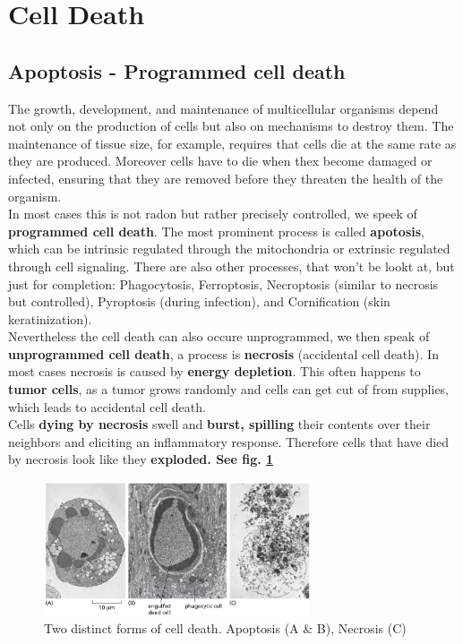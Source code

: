 \documentclass[../main.tex]{subfiles}
\begin{document}
	
\section{Cell Death}



\subsection{Apoptosis - Programmed cell death}
The growth, development, and maintenance of multicellular organisms depend not only on the production of cells but also on mechanisms to destroy them. The maintenance of tissue size, for example, requires that cells die at the same rate as they are produced. Moreover cells have to die when thex become damaged or infected, ensuring that they are removed before they threaten the health of the organism.\\
\indent In most cases this is not radon but rather precisely controlled, we speek of \textbf{programmed cell death}. The most prominent process is called \textbf{apotosis}, which can be intrinsic regulated through the mitochondria or extrinsic regulated through cell signaling. There are also other processes, that won't be lookt at, but just for completion: Phagocytosis, Ferroptosis, Necroptosis (similar to necrosis but controlled), Pyroptosis (during infection), and Cornification (skin keratinization). \\
\indent Nevertheless the cell death can also occure unprogrammed, we then speak of \textbf{unprogrammed cell death}, a process is \textbf{\gls{necrosis}} (accidental cell death). In most cases necrosis is caused by \textbf{energy depletion}. This often happens to \textbf{tumor cells}, as a tumor grows randomly and cells can get cut of from supplies, which leads to accidental cell death. \\
\indent Cells \textbf{dying by necrosis} swell and \textbf{burst, spilling} their contents over their neighbors and eliciting an inflammatory response. Therefore cells that have died by necrosis look like they \textbf{exploded. See fig. \ref{necrosis}}

\begin{figure}[H]
	\centering
	\includegraphics[width = 0.7\textwidth]{1}
	\caption{Two distinct forms of cell death. Apoptosis (A \& B), Necrosis (C)}
	\label{necrosis}
\end{figure}
\end{document}
